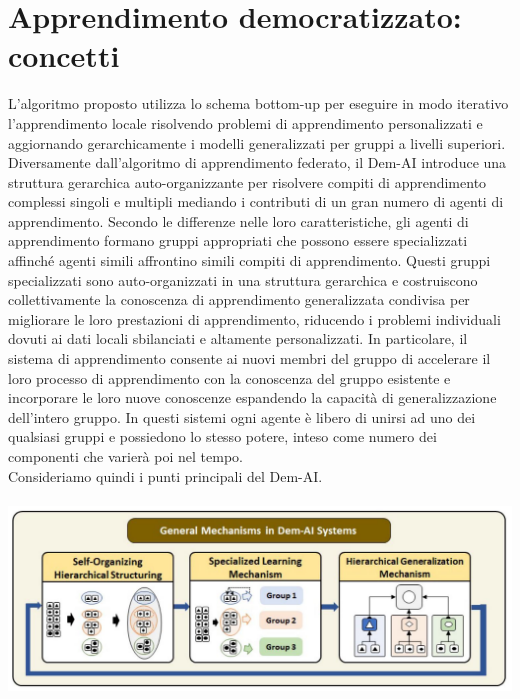 \chapter{Apprendimento democratizzato: concetti}\label{ch:chapter2}
L'algoritmo proposto utilizza lo schema bottom-up per eseguire in modo iterativo l'apprendimento locale risolvendo problemi di apprendimento personalizzati e aggiornando gerarchicamente i modelli generalizzati per gruppi a livelli superiori.\\
Diversamente dall'algoritmo di apprendimento federato, il Dem-AI introduce una struttura gerarchica auto-organizzante per risolvere compiti di apprendimento complessi singoli e multipli mediando i contributi di un gran numero di agenti di apprendimento. Secondo le differenze nelle loro caratteristiche, gli agenti di apprendimento formano gruppi appropriati che possono essere specializzati affinché agenti simili affrontino simili compiti di apprendimento. Questi gruppi specializzati sono auto-organizzati in una struttura gerarchica e costruiscono collettivamente la conoscenza di apprendimento generalizzata condivisa per migliorare le loro prestazioni di apprendimento, riducendo i problemi individuali dovuti ai dati locali sbilanciati e altamente personalizzati. In particolare, il sistema di apprendimento consente ai nuovi membri del gruppo di accelerare il loro processo di apprendimento con la conoscenza del gruppo esistente e incorporare le loro nuove conoscenze espandendo la capacità di generalizzazione dell'intero gruppo. In questi sistemi ogni agente è libero di unirsi ad uno dei qualsiasi gruppi e possiedono lo stesso potere, inteso come numero dei componenti che varierà poi nel tempo.\\
Consideriamo quindi i punti principali del Dem-AI.\\\\
\includegraphics[scale=0.25]{DemIA}
 \vspace{0.5cm}


